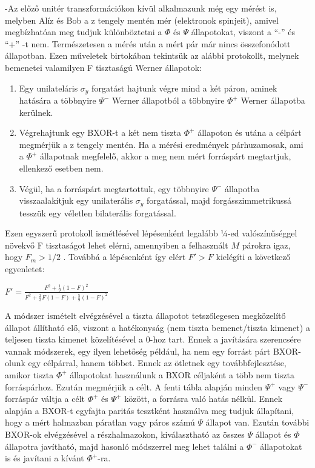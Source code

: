 -Az előző unitér transzformációkon kívül alkalmazunk még egy mérést is, melyben Alíz és Bob a z tengely mentén mér (elektronok spinjeit), amivel megbízhatóan meg tudjuk különböztetni a $\Phi$ és $\Psi$ állapotokat, viszont a ``-'' és ``+'' -t nem. Természetesen a mérés után a mért pár már nincs összefonódott állapotban.
Ezen műveletek birtokában tekintsük az alábbi protokollt, melynek bemenetei valamilyen F tisztaságú Werner állapotok:
\begin{enumerate}
\item Egy unilateláris $\sigma_y$ forgatást hajtunk végre mind a két páron, aminek hatására a többnyire $\Psi^-$ Werner állapotból a többnyire $\Phi^+$ Werner állapotba kerülnek.
\item Végrehajtunk egy  BXOR-t a két nem tiszta $\Phi^+$ állapoton és utána a célpárt megmérjük a z tengely mentén. Ha a mérési eredmények párhuzamosak, ami a $\Phi^+$ állapotnak megfelelő, akkor a meg nem mért forráspárt  megtartjuk, ellenkező esetben nem.
\item Végül, ha a forráspárt megtartottuk, egy többnyire $\Psi^-$ állapotba visszaalakítjuk egy unilaterális $\sigma_y$ forgatással, majd forgásszimmetrikussá tesszük egy véletlen bilaterális forgatással.
\end{enumerate}
Ezen egyszerű protokoll ismétlésével lépésenként legalább ¼-ed valószínűséggel növekvő F tisztaságot lehet elérni, amennyiben a felhasznált $M$ párokra igaz, hogy
$F_m > 1/2$  . Továbbá a lépésenként így elért $F'>F$ kielégíti a következő egyenletet:\\
\begin{center}
$F' = \frac{F^2 + \frac{1}{9}(1-F)^2}{F^2 + \frac{2}{3}F(1-F) + \frac{5}{9}(1-F)^2} $
\end{center}
A módszer ismételt elvégzésével a tiszta állapotot tetszőlegesen megközelítő állapot állítható elő, viszont a hatékonyság (nem tiszta bemenet/tiszta kimenet)  a teljesen tiszta kimenet közelítésével a 0-hoz tart. Ennek a javítására szerencsére vannak módszerek, egy ilyen lehetőség például, ha nem egy forrást párt BXOR-olunk egy célpárral, hanem többet. Ennek az ötletnek egy továbbfejlesztése, amikor tiszta $\Phi^+$  állapotokat használunk a BXOR céljaként a több nem tiszta forráspárhoz. Ezután megmérjük a célt. A fenti tábla alapján minden $\Psi^+$ vagy $\Psi^-$ forráspár váltja a célt $\Phi^+$ és $\Psi^+$ között, a forrásra való hatás nélkül. Ennek alapján a BXOR-t egyfajta paritás tesztként használva meg tudjuk állapítani, hogy a mért halmazban páratlan vagy páros számú $\Psi$ állapot van. Ezután további BXOR-ok elvégzésével a részhalmazokon, kiválasztható az összes $\Psi$ állapot és $\Phi$ állapotra javítható, majd hasonló módszerrel meg lehet találni a $\Phi^-$ állapotokat is és javítani a kívánt $\Phi^+$-ra.\\
